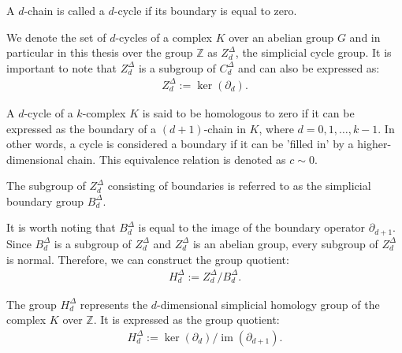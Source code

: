 \begin{definition}[$d$-Cycle]{\cite[\S 2, p. 106]{hatcher2005algebraic}}
	A $d$-chain is called a $d$-cycle if its boundary is equal to zero.
\end{definition}

We denote the set of \( d \)-cycles of a complex \( K \) over an abelian group $G$ and in particular in this thesis over the group \( \mathbb{Z} \) as \( Z^{\Delta}_{d} \), the simplicial cycle group. It is important to note that \( Z^{\Delta}_{d} \) is a subgroup of \( C^{\Delta}_{d} \) and can also be expressed as:
\begin{align}
	Z^{\Delta}_{d} := \ker(\partial_{d}). 
\end{align}

A \( d \)-cycle of a \( k \)-complex \( K \) is said to be homologous to zero if it can be expressed as the boundary of a \( (d+1) \)-chain in \( K \), where \( d = 0, 1, \ldots, k-1 \). In other words, a cycle is considered a boundary if it can be 'filled in' by a higher-dimensional chain. This equivalence relation is denoted as \( c \sim 0 \).

\begin{definition}{\cite[\S 2.3]{zomorodian2004computing}}
	The subgroup of $Z^{\Delta}_{d}$ consisting of boundaries is referred to as the simplicial boundary group $B^{\Delta}_{d}$.
\end{definition}

It is worth noting that \( B^{\Delta}_{d} \) is equal to the image of the boundary operator \( \partial_{d+1} \). Since \( B^{\Delta}_{d} \) is a subgroup of \( Z^{\Delta}_{d} \) and \( Z^{\Delta}_{d} \) is an abelian group, every subgroup of \( Z^{\Delta}_{d} \) is normal. Therefore, we can construct the group quotient:
\begin{align}
	H^{\Delta}_{d} := Z^{\Delta}_{d} / B^{\Delta}_{d}. 
\end{align}

\begin{definition}{\cite[\S 2, p. 106]{hatcher2005algebraic}} 
	The group \( H^{\Delta}_{d} \) represents the \( d \)-dimensional simplicial homology group of the complex \( K \) over \( \mathbb{Z} \). It is expressed as the group quotient:
	\begin{align}
		H^{\Delta}_{d} := \ker(\partial_{d}) / \operatorname{im}(\partial_{d+1}). 
	\end{align}
\end{definition}


